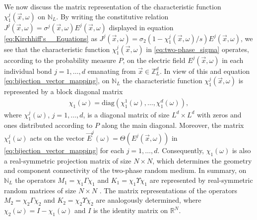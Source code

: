 \documentclass{cmslatex}
\begin{document}
We now discuss the matrix representation of the characteristic
function $\chi_1^j(\vec{x},\omega)$ on $\mathbb{N}_L$. By writing the
constitutive relation $J^j(\vec{x},\omega)=\sigma^j(\vec{x},\omega)E^j(\vec{x},\omega)$
displayed in equation \eqref{eq:Kirchhiff's__Equations} as
$J^j(\vec{x},\omega)=\sigma_2(1-\chi_1^j(\vec{x},\omega)/s)E^j(\vec{x},\omega)$, 
we see that the characteristic
function $\chi_1^j(\vec{x},\omega)$ in \eqref{eq:two-phase_sigma} operates,
according to the probability measure $P$, on the electric field
$E^j(\vec{x},\omega)$ in each individual bond $j=1,\ldots,d$ emanating from
$\vec{x}\in\mathbb{Z}_L^d$. In view of this and equation
\eqref{eq:bijection_vector_mapping}, on
$\mathbb{N}_L$ the characteristic function $\chi_1^j(\vec{x},\omega)$ is
represented by a block diagonal matrix 
%
\begin{align}\label{eq:block_diag_chi}  
  \chi_1(\omega)=\text{diag}(\chi_1^1(\omega),\ldots,\chi_1^d(\omega)),
\end{align}
%
where $\chi_1^j(\omega)$, $j=1,\ldots,d$, is a diagonal matrix of size $L^d\times L^d$ with
zeros and ones distributed according to $P$ along the main
diagonal. Moreover, the matrix $\chi_1^j(\omega)$ acts on the vector
$\vec{E}^j(\omega)=\Theta(E^j(\vec{x},\omega))$ in
\eqref{eq:bijection_vector_mapping} for each $j=1,\ldots,d$. Consequently, 
$\chi_1(\omega)$ is also a real-symmetric projection matrix of size $N\times N$,
which determines the geometry and component connectivity of the
two-phase random medium. In summary, on $\mathbb{N}_L$ the operators
$M_1=\chi_1\Gamma\chi_1$ and $K_1=\chi_1\Upsilon\chi_1$ are represented by real-symmetric
random matrices of size $N\times N$
\cite{Golden:JBM:337,Murphy:JMP:063506}. The matrix
representations of the operators $M_2=\chi_2\Gamma\chi_2$ and $K_2=\chi_2\Upsilon\chi_2$ are
analogously determined, where $\chi_2(\omega)=I-\chi_1(\omega)$ and $I$ is the
identity matrix on $\mathbb{R}^N$. 
\end{document}
